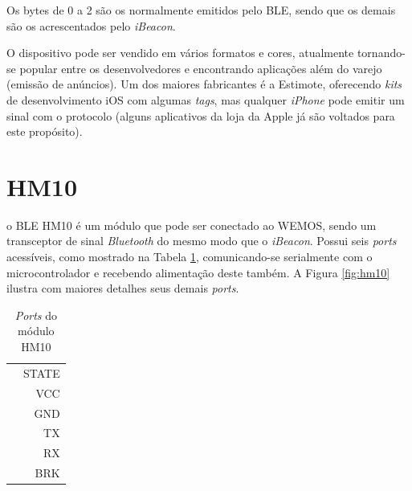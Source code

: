 \documentclass[
	12pt,				%
	openright,			%
	twoside,			%
	a4paper,			%
	english,			%
	french,				%
	spanish,			%
	brazil				%
	]{abntex2}
\begin{document}
Os bytes de 0 a 2 são os normalmente emitidos pelo BLE, sendo que os demais são os acrescentados pelo \emph{iBeacon}. 

O dispositivo pode ser vendido em vários formatos e cores, atualmente tornando-se popular entre os desenvolvedores e encontrando aplicações além do varejo (emissão de anúncios). Um dos maiores fabricantes é a Estimote, oferecendo \emph{kits} de desenvolvimento iOS com algumas \emph{tags}, mas qualquer \textit{iPhone} pode emitir um sinal com o protocolo (alguns aplicativos da loja da Apple já são voltados para este propósito).

\section{HM10}

o BLE HM10 é um módulo que pode ser conectado ao WEMOS, sendo um transceptor de sinal \textit{Bluetooth} do mesmo modo que o \textit{iBeacon}. Possui seis \textit{ports} acessíveis, como mostrado na Tabela \ref{table:hm10}, comunicando-se serialmente com o microcontrolador e recebendo alimentação deste também. A Figura \ref{fig:hm10} ilustra com maiores detalhes seus demais \textit{ports}. 

\begin{table}[t!]
    \centering
    \begin{tabular}{ | c  r | } 
        \hline
                        & STATE \\
                        & VCC \\
                        & GND \\
                        & TX \\
                        & RX \\
                        & BRK \\
        \hline
    \end{tabular}
    \caption{\textit{Ports} do módulo HM10}
    \label{table:hm10}
\end{table}
\end{document}
